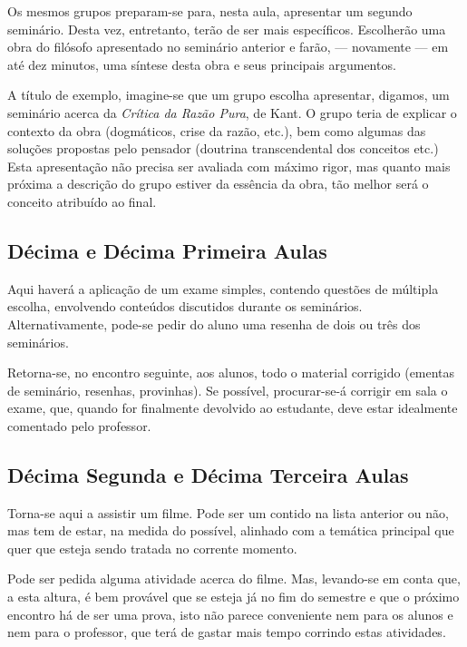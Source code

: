 \documentclass[12pt,a4paper]{article}
\begin{document}
	Os mesmos grupos preparam-se para, nesta aula, apresentar um 
	segundo seminário. Desta vez, entretanto, terão de ser mais 
	específicos. Escolherão uma obra do filósofo apresentado no 
	seminário anterior e farão, --- novamente --- em até dez minutos, 
	uma síntese desta obra e seus principais argumentos. 
	
	A título de exemplo, imagine-se que um grupo escolha apresentar, 
	digamos, um seminário acerca da \textit{Crítica da Razão Pura}, 
	de Kant. O grupo teria de explicar o contexto da obra (dogmáticos, 
	crise da razão, etc.), bem como algumas das soluções propostas 
	pelo pensador (doutrina transcendental dos conceitos etc.) Esta 
	apresentação não precisa ser avaliada com máximo rigor, mas quanto 
	mais próxima a descrição do grupo estiver da essência da obra, 
	tão melhor será o conceito atribuído ao final. 
	
	\subsection*{Décima e Décima Primeira Aulas}
	
	Aqui haverá a aplicação de um exame simples, contendo questões 
	de múltipla escolha, envolvendo conteúdos discutidos durante os 
	seminários. Alternativamente, pode-se pedir do aluno uma resenha 
	de dois ou três dos seminários. 
	
	Retorna-se, no encontro seguinte, aos alunos, todo o material 
	corrigido (ementas de seminário, resenhas, provinhas). Se possível, 
	procurar-se-á corrigir em sala o exame, que, quando for finalmente 
	devolvido ao estudante, deve estar idealmente comentado 
	pelo professor. 
	
	\subsection*{Décima Segunda e Décima Terceira Aulas}
	
	Torna-se aqui a assistir um filme. Pode ser um contido na 
	lista anterior ou não, mas tem de estar, na medida do possível, 
	alinhado com a temática principal que quer que esteja sendo 
	tratada no corrente momento. 
	
	Pode ser pedida alguma atividade acerca do filme. Mas, 
	levando-se em conta que, a esta altura, é bem provável que se esteja 
	já no fim do semestre e que o próximo encontro há de ser uma prova, 
	isto não parece conveniente nem para os alunos e nem para o professor, 
	que terá de gastar mais tempo corrindo estas atividades. 
	
\end{document}

